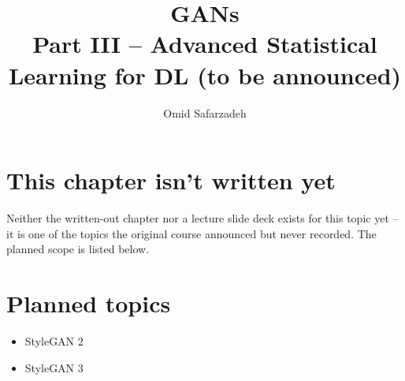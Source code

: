 \documentclass[11pt]{article}
\title{GANs \\ \large Part III -- Advanced Statistical Learning for DL (to be announced)}
\author{Omid Safarzadeh}
\date{}
\begin{document}
\maketitle

\section*{This chapter isn't written yet}
Neither the written-out chapter nor a lecture slide deck exists for this
topic yet -- it is one of the topics the original course announced but
never recorded. The planned scope is listed below.




\section*{Planned topics}
\begin{itemize}
  \item StyleGAN 2
  \item StyleGAN 3
\end{itemize}
\end{document}

